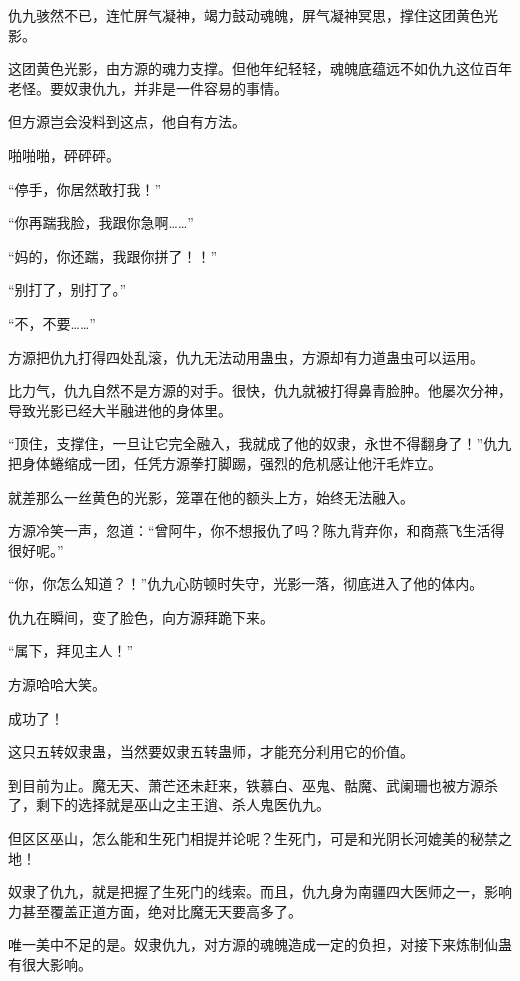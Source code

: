 
\begin{this_body}



仇九骇然不已，连忙屏气凝神，竭力鼓动魂魄，屏气凝神冥思，撑住这团黄色光影。

这团黄色光影，由方源的魂力支撑。但他年纪轻轻，魂魄底蕴远不如仇九这位百年老怪。要奴隶仇九，并非是一件容易的事情。

但方源岂会没料到这点，他自有方法。

啪啪啪，砰砰砰。

“停手，你居然敢打我！”

“你再踹我脸，我跟你急啊……”

“妈的，你还踹，我跟你拼了！！”

“别打了，别打了。”

“不，不要……”

方源把仇九打得四处乱滚，仇九无法动用蛊虫，方源却有力道蛊虫可以运用。

比力气，仇九自然不是方源的对手。很快，仇九就被打得鼻青脸肿。他屡次分神，导致光影已经大半融进他的身体里。

“顶住，支撑住，一旦让它完全融入，我就成了他的奴隶，永世不得翻身了！”仇九把身体蜷缩成一团，任凭方源拳打脚踢，强烈的危机感让他汗毛炸立。

就差那么一丝黄色的光影，笼罩在他的额头上方，始终无法融入。

方源冷笑一声，忽道：“曾阿牛，你不想报仇了吗？陈九背弃你，和商燕飞生活得很好呢。”

“你，你怎么知道？！”仇九心防顿时失守，光影一落，彻底进入了他的体内。

仇九在瞬间，变了脸色，向方源拜跪下来。

“属下，拜见主人！”

方源哈哈大笑。

成功了！

这只五转奴隶蛊，当然要奴隶五转蛊师，才能充分利用它的价值。

到目前为止。魔无天、萧芒还未赶来，铁慕白、巫鬼、骷魔、武阑珊也被方源杀了，剩下的选择就是巫山之主王逍、杀人鬼医仇九。

但区区巫山，怎么能和生死门相提并论呢？生死门，可是和光阴长河媲美的秘禁之地！

奴隶了仇九，就是把握了生死门的线索。而且，仇九身为南疆四大医师之一，影响力甚至覆盖正道方面，绝对比魔无天要高多了。

唯一美中不足的是。奴隶仇九，对方源的魂魄造成一定的负担，对接下来炼制仙蛊有很大影响。


\end{this_body}
